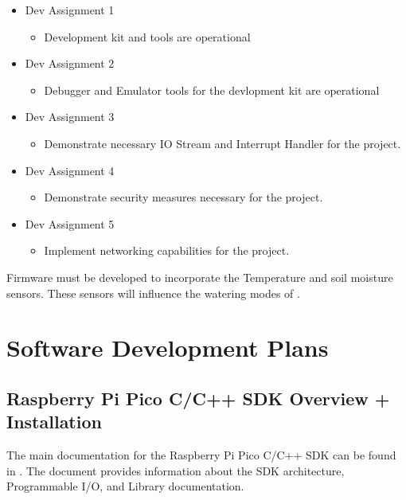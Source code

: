 {\begin{itemize}
    \item Dev Assignment 1
    \begin{itemize}
        \item Development kit and tools are operational
    \end{itemize}
    \item Dev Assignment 2
    \begin{itemize}
        \item Debugger and Emulator tools for the devlopment kit are operational
    \end{itemize}
    \item Dev Assignment 3
    \begin{itemize}
        \item Demonstrate necessary IO Stream and Interrupt Handler for the project.
    \end{itemize}
    \item Dev Assignment 4
    \begin{itemize}
        \item Demonstrate security measures necessary for the project.
    \end{itemize}
    \item Dev Assignment 5
    \begin{itemize}
        \item Implement networking capabilities for the project.
    \end{itemize}
\end{itemize}

Firmware must be developed to incorporate the Temperature and soil moisture sensors. These sensors will influence the watering modes of \ThisSys.
\section{Software Development Plans}
\label{loc:SDP_SoftwareDevelopmentPlans}
% 

\subsection{Raspberry Pi Pico C/C++ SDK Overview + Installation}

The main documentation for the Raspberry Pi Pico C/C++ SDK can be found in \citePicoSDK. 
The document provides information about the SDK architecture, Programmable I/O, and Library documentation. 

}

